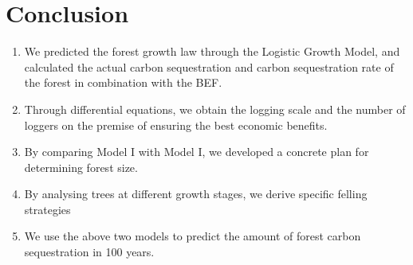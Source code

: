 \documentclass[12pt]{article}
\begin{document}
\section{Conclusion}
\begin{enumerate}
    \item We predicted the forest growth law through the Logistic Growth Model, and
          calculated the actual carbon sequestration and carbon sequestration rate of the
          forest in combination with the BEF. %
    \item Through differential equations, we obtain the logging scale and the number of
          loggers on the premise of ensuring the best economic benefits. %
    \item By comparing Model I with Model I, we developed a concrete plan for determining
          forest size.
    \item By analysing trees at different growth stages, we derive specific felling
          strategies
    \item We use the above two models to predict the amount of forest carbon
          sequestration in 100 years.
\end{enumerate}

\end{document}
